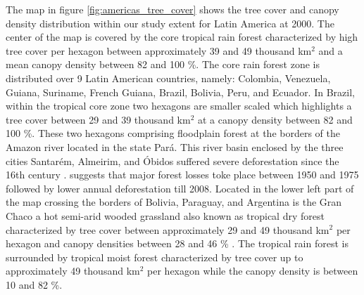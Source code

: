 			The map in figure \ref{fig:americas_tree_cover} shows the tree cover and canopy density distribution within our study extent for Latin America at 2000. The center of the map is covered by the core tropical rain forest characterized by high tree cover per hexagon between approximately 39 and 49 thousand km$^2$ and a mean canopy density between 82 and 100 \%. The core rain forest zone is distributed over 9 Latin American countries, namely: Colombia, Venezuela, Guiana, Suriname, French Guiana, Brazil, Bolivia, Peru, and Ecuador. In Brazil, within the tropical core zone two hexagons are smaller scaled which highlights a tree cover between 29 and 39 thousand km$^2$ at a canopy density between 82 and 100 \%. These two hexagons comprising floodplain forest at the borders of the Amazon river located in the state Pará. This river basin enclosed by the three cities Santarém, Almeirim, and Óbidos suffered severe deforestation since the 16th century \citep{Reno2011}. \citeauthor{Reno2011} suggests that major forest losses toke place between 1950 and 1975 followed by lower annual deforestation till 2008. Located in the lower left part of the map crossing the borders of Bolivia, Paraguay, and Argentina is the Gran Chaco a hot semi-arid wooded grassland also known as tropical dry forest characterized by tree cover between approximately 29 and 49 thousand km$^2$ per hexagon and canopy densities between 28 and 46 \% \citep{Caldas2013}. The tropical rain forest is surrounded by tropical moist forest characterized by tree cover up to approximately 49 thousand km$^2$ per hexagon while the canopy density is between 10 and 82 \%.
